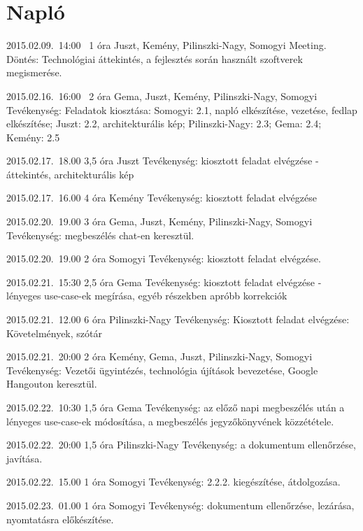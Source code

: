%
\section{Napló}

\begin{naplo}

\bejegyzes
{2015.02.09.~14:00~} %
{1 óra} %
{Juszt, Kemény, Pilinszki-Nagy, Somogyi} %
{Meeting. Döntés: Technológiai áttekintés, a fejlesztés során használt szoftverek megismerése.} %

\bejegyzes
{2015.02.16.~16:00~}
{2 óra}
{Gema, Juszt, Kemény, Pilinszki-Nagy, Somogyi} %
{Tevékenység: Feladatok kiosztása: Somogyi: 2.1, napló elkészítése, vezetése, fedlap elkészítése; Juszt: 2.2, architekturális kép; Pilinszki-Nagy: 2.3; Gema: 2.4; Kemény: 2.5}

\bejegyzes
{2015.02.17.~18.00}
{3,5 óra}
{Juszt}
{Tevékenység: kiosztott feladat elvégzése - áttekintés, architekturális kép}

\bejegyzes
{2015.02.17.~16.00}
{4 óra}
{Kemény}
{Tevékenység: kiosztott feladat elvégzése}

\bejegyzes
{2015.02.20.~19.00}
{3 óra}
{Gema, Juszt, Kemény, Pilinszki-Nagy, Somogyi}
{Tevékenység: megbeszélés chat-en keresztül.}

\bejegyzes
{2015.02.20.~19.00}
{2 óra}
{Somogyi}
{Tevékenység: kiosztott feladat elvégzése.}

\bejegyzes
{2015.02.21.~15:30}
{2,5 óra}
{Gema}
{Tevékenység: kiosztott feladat elvégzése - lényeges use-case-ek megírása, egyéb részekben apróbb korrekciók}

\bejegyzes
{2015.02.21.~12.00}
{6 óra}
{Pilinszki-Nagy}
{Tevékenység: \newline Kiosztott feladat elvégzése: Követelmények, szótár}

\bejegyzes
{2015.02.21.~20:00}
{2 óra}
{Kemény, Gema, Juszt, Pilinszki-Nagy, Somogyi}
{Tevékenység: Vezetői ügyintézés, technológia újítások bevezetése, Google Hangouton keresztül.}

\bejegyzes
{2015.02.22.~10:30}
{1,5 óra}
{Gema}
{Tevékenység: az előző napi megbeszélés után a lényeges use-case-ek módosítása, a megbeszélés jegyzőkönyvének közzététele.}

\bejegyzes
{2015.02.22.~20:00}
{1,5 óra}
{Pilinszki-Nagy}
{Tevékenység: a dokumentum ellenőrzése, javítása.}

\bejegyzes
{2015.02.22.~15.00}
{1 óra}
{Somogyi}
{Tevékenység: 2.2.2. kiegészítése, átdolgozása.}

\bejegyzes
{2015.02.23.~01.00}
{1 óra}
{Somogyi}
{Tevékenység: dokumentum ellenőrzése, lezárása, nyomtatásra előkészítése.}
\end{naplo}

